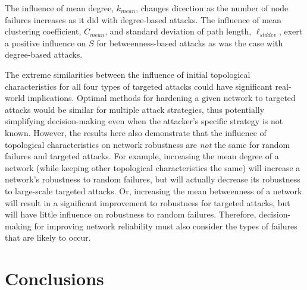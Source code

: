 The influence of mean degree, $k_{mean}$, changes direction as the number of node failures increases as it did with degree-based attacks. The influence of mean clustering coefficient, $C_{mean}$, and standard deviation of path length, $\ell_{std dev}$, exert a positive influence on $S$ for betweenness-based attacks as was the case with degree-based attacks.

The extreme similarities between the influence of initial topological characteristics for all four types of targeted attacks could have significant real-world implications. Optimal methods for hardening a given network to targeted attacks would be similar for multiple attack strategies, thus potentially simplifying decision-making even when the attacker's specific strategy is not known.  However, the results here also demonstrate that the influence of topological characteristics on network robustness are \emph{not} the same for random failures and targeted attacks.  For example, increasing the mean degree of a network (while keeping other topological characteristics the same) will increase a network's robustness to random failures, but will actually decrease its robustness to large-scale targeted attacks.  Or, increasing the mean betweenness of a network will result in a significant improvement to robustness for targeted attacks, but will have little influence on robustness to random failures.  Therefore, decision-making for improving network reliability must also consider the types of failures that are likely to occur.


\section{Conclusions}
\label{sec:ch2:conclusions}

